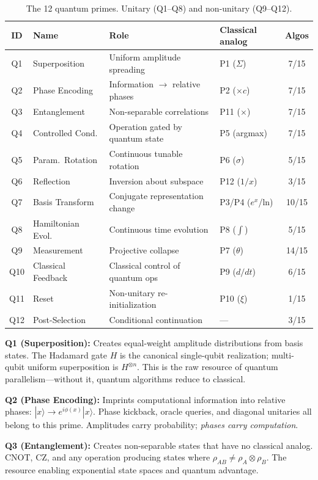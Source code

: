 \documentclass[11pt]{article}
\begin{document}
\begin{table}[h]
\centering
\caption{The 12 quantum primes. Unitary (Q1--Q8) and non-unitary (Q9--Q12).}
\label{tab:qprimes}
\footnotesize
\begin{tabular}{clllc}
\toprule
ID & Name & Role & Classical analog & Algos \\
\midrule
Q1 & Superposition & Uniform amplitude spreading & P1 ($\Sigma$) & 7/15 \\
Q2 & Phase Encoding & Information $\to$ relative phases & P2 ($\times c$) & 7/15 \\
Q3 & Entanglement & Non-separable correlations & P11 ($\times$) & 7/15 \\
Q4 & Controlled Cond. & Operation gated by quantum state & P5 (argmax) & 7/15 \\
Q5 & Param.\ Rotation & Continuous tunable rotation & P6 ($\sigma$) & 5/15 \\
Q6 & Reflection & Inversion about subspace & P12 ($1/x$) & 3/15 \\
Q7 & Basis Transform & Conjugate representation change & P3/P4 ($e^x$/ln) & 10/15 \\
Q8 & Hamiltonian Evol. & Continuous time evolution & P8 ($\int$) & 5/15 \\
\midrule
Q9 & Measurement & Projective collapse & P7 ($\theta$) & 14/15 \\
Q10 & Classical Feedback & Classical control of quantum ops & P9 ($d/dt$) & 6/15 \\
Q11 & Reset & Non-unitary re-initialization & P10 ($\xi$) & 1/15 \\
Q12 & Post-Selection & Conditional continuation & --- & 3/15 \\
\bottomrule
\end{tabular}
\end{table}

\textbf{Q1 (Superposition):} Creates equal-weight amplitude distributions from basis states. The Hadamard gate $H$ is the canonical single-qubit realization; multi-qubit uniform superposition is $H^{\otimes n}$. This is the raw resource of quantum parallelism---without it, quantum algorithms reduce to classical.

\textbf{Q2 (Phase Encoding):} Imprints computational information into relative phases: $|x\rangle \to e^{i\phi(x)}|x\rangle$. Phase kickback, oracle queries, and diagonal unitaries all belong to this prime. Amplitudes carry probability; \textit{phases carry computation}.

\textbf{Q3 (Entanglement):} Creates non-separable states that have no classical analog. CNOT, CZ, and any operation producing states where $\rho_{AB} \neq \rho_A \otimes \rho_B$. The resource enabling exponential state spaces and quantum advantage.
\end{document}
